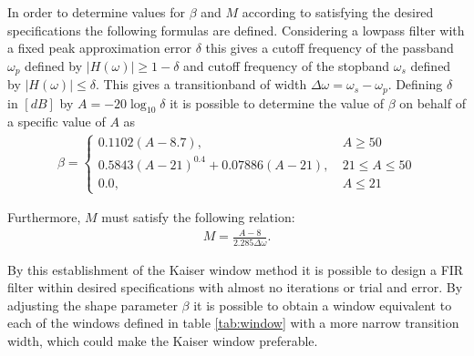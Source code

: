 In order to determine values for $\beta$ and $M$ according to  satisfying the desired specifications the following formulas are defined. Considering a lowpass filter with a fixed peak approximation error $\delta$ this gives a cutoff frequency of the passband $\omega_p$ defined by $|H(\omega)| \geq 1-\delta$ and cutoff frequency of the stopband $\omega_s$ defined by $|H(\omega)| \leq \delta$. This gives a transitionband of width $\Delta \omega = \omega_s - \omega_p$. Defining $\delta$ in $[dB]$ by $A=-20\log_{10} \delta$ it is possible to determine the value of $\beta$ on behalf of a specific value of $A$ as 
\begin{align}
\beta =
\left\{ \begin{matrix}
0.1102\left( A-8.7 \right), &\ A \geq 50 \\
0.5843\left(A-21\right)^{0.4}+0.07886(A-21), &\ 21 \leq A \leq 50 \\
0.0, &\  A \leq 21 
\end{matrix}\right.
\end{align}
       
Furthermore, $M$ must satisfy the following relation:
\begin{align}
M=\frac{A-8}{2.285\Delta \omega}.
\end{align}

By this establishment of the Kaiser window method it is possible to design a FIR filter within desired specifications with almost no iterations or trial and error. By adjusting the shape parameter $\beta$ it is possible to obtain a window equivalent to each of the windows defined in table \ref{tab:window} with a more narrow transition width, which could make the Kaiser window preferable.       
   
